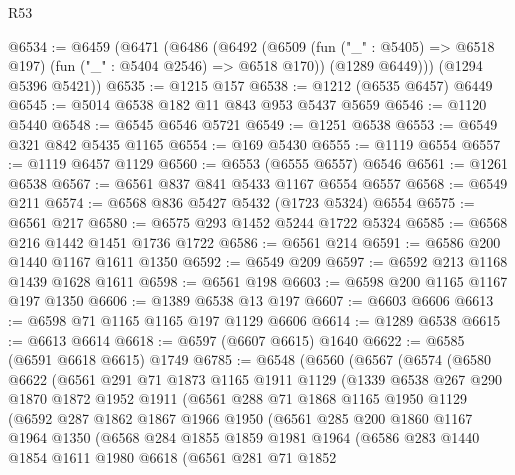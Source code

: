 \begin{lexlean}{R53}
\begin{coremodule}
@6534 := @6459
    (@6471
      (@6486
        (@6492
          (@6509 (fun ("_" : @5405) => @6518 @197) (fun ("_" : @5404 @2546) => @6518 @170))
          (@1289 @6449)))
      (@1294 @5396 @5421))
@6535 := @1215 @157
@6538 := @1212 (@6535 @6457) @6449
@6545 := @5014 @6538 @182 @11 @843 @953 @5437 @5659
@6546 := @1120 @5440
@6548 := @6545 @6546 @5721
@6549 := @1251 @6538
@6553 := @6549 @321 @842 @5435 @1165
@6554 := @169 @5430
@6555 := @1119 @6554
@6557 := @1119 @6457 @1129
@6560 := @6553 (@6555 @6557) @6546
@6561 := @1261 @6538
@6567 := @6561 @837 @841 @5433 @1167 @6554 @6557
@6568 := @6549 @211
@6574 := @6568 @836 @5427 @5432 (@1723 @5324) @6554
@6575 := @6561 @217
@6580 := @6575 @293 @1452 @5244 @1722 @5324
@6585 := @6568 @216 @1442 @1451 @1736 @1722
@6586 := @6561 @214
@6591 := @6586 @200 @1440 @1167 @1611 @1350
@6592 := @6549 @209
@6597 := @6592 @213 @1168 @1439 @1628 @1611
@6598 := @6561 @198
@6603 := @6598 @200 @1165 @1167 @197 @1350
@6606 := @1389 @6538 @13 @197
@6607 := @6603 @6606
@6613 := @6598 @71 @1165 @1165 @197 @1129 @6606
@6614 := @1289 @6538
@6615 := @6613 @6614
@6618 := @6597 (@6607 @6615) @1640
@6622 := @6585 (@6591 @6618 @6615) @1749
@6785 := @6548
    (@6560
      (@6567
        (@6574
          (@6580
            @6622
            (@6561
              @291
              @71
              @1873
              @1165
              @1911
              @1129
              (@1339
                @6538
                @267
                @290
                @1870
                @1872
                @1952
                @1911
                (@6561
                  @288
                  @71
                  @1868
                  @1165
                  @1950
                  @1129
                  (@6592
                    @287
                    @1862
                    @1867
                    @1966
                    @1950
                    (@6561
                      @285
                      @200
                      @1860
                      @1167
                      @1964
                      @1350
                      (@6568
                        @284
                        @1855
                        @1859
                        @1981
                        @1964
                        (@6586
                          @283
                          @1440
                          @1854
                          @1611
                          @1980
                          @6618
                          (@6561
                            @281
                            @71
                            @1852

\end{coremodule}
\end{lexlean}
